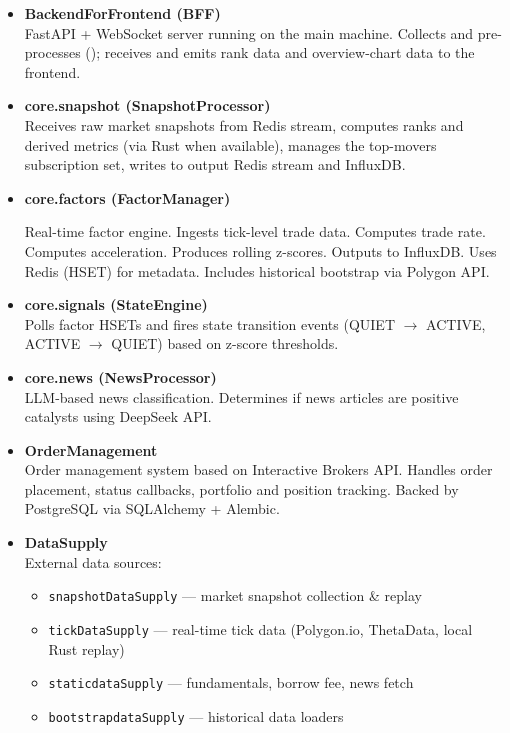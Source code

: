 \documentclass[a4paper, 11pt]{article}
\begin{document}
{\small\RaggedRight
\begin{itemize}[leftmargin=*,labelsep=6pt]
    \item \textbf{BackendForFrontend (BFF)} \\
    FastAPI + WebSocket server running on the main machine. Collects and pre-processes (\texttt{}); receives and emits rank data and overview-chart data to the frontend.

    \item \textbf{core.snapshot (SnapshotProcessor)} \\
    Receives raw market snapshots from Redis stream, computes ranks and derived metrics (via Rust when available), manages the top-movers subscription set, writes to output Redis stream and InfluxDB.

    \item \textbf{core.factors (FactorManager)} \\
    {\scriptsize\RaggedRight Real-time factor engine. Ingests tick-level trade data.
    Computes trade rate. Computes acceleration. Produces rolling z-scores.
    Outputs to InfluxDB. Uses Redis (HSET) for metadata. Includes historical bootstrap via Polygon API.\par}\justifying

    \item \textbf{core.signals (StateEngine)} \\
    Polls factor HSETs and fires state transition events (QUIET $\to$ ACTIVE, ACTIVE $\to$ QUIET) based on z-score thresholds.

    \item \textbf{core.news (NewsProcessor)} \\
    LLM-based news classification. Determines if news articles are positive catalysts using DeepSeek API.

    \item \textbf{OrderManagement} \\
    Order management system based on Interactive Brokers API. Handles order placement, status callbacks, portfolio and position tracking. Backed by PostgreSQL via SQLAlchemy + Alembic.

    \item \textbf{DataSupply} \\
    External data sources:
    \begin{itemize}
        \item \texttt{snapshotDataSupply} --- market snapshot collection \& replay
        \item \texttt{tickDataSupply} --- real-time tick data (Polygon.io, ThetaData, local Rust replay)
        \item \texttt{staticdataSupply} --- fundamentals, borrow fee, news fetch
        \item \texttt{bootstrapdataSupply} --- historical data loaders
    \end{itemize}


\end{itemize}}
\end{document}
